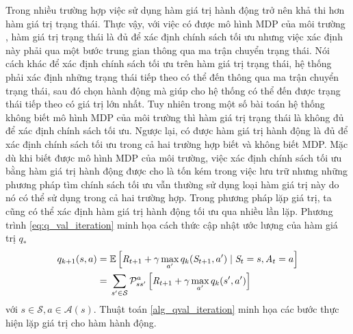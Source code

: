 Trong nhiều trường hợp việc sử dụng hàm giá trị hành động trở nên khả thi hơn hàm giá trị trạng thái. Thực vậy, với việc có được mô hình MDP của môi trường , hàm giá trị trạng thái là đủ để xác định chính sách tối ưu nhưng việc xác định này phải qua một bước trung gian thông qua ma trận chuyển trạng thái. Nói cách khác để xác định chính sách tối ưu trên hàm giá trị trạng thái, hệ thống phải xác định những trạng thái tiếp theo có thể đến thông qua ma trận chuyển trạng thái, sau đó chọn hành động mà giúp cho hệ thống có thể đến được trạng thái tiếp theo có giá trị lớn nhất. Tuy nhiên trong một số bài toán hệ thống không biết mô hình MDP của môi trường thì hàm giá trị trạng thái là không đủ để xác định chính sách tối ưu. Ngược lại, có được hàm giá trị hành động là đủ để xác định chính sách tối ưu trong cả hai trường hợp biết và không biết MDP. Mặc dù khi biết được mô hình MDP của môi trường, việc xác định chính sách tối ưu bằng hàm giá trị hành động được cho là tốn kém trong việc lưu trữ nhưng những phương pháp tìm chính sách tối ưu vẫn thường sử dụng loại hàm giá trị này do nó có thể sử dụng trong cả hai trường hợp. Trong phương pháp lặp giá trị, ta cũng có thể xác định hàm giá trị hành động tối ưu qua nhiều lần lặp. Phương trình \ref{eq:q_val_iteration} minh họa cách thức cập nhật ước lượng của hàm giá trị $q_*$
\begin{align}
q_{k+1}(s,a) = {} & \mathbb{E}\left[\mathit{R}_{t+1} + \gamma \max_{a'}q_{k}(\mathit{S}_{t+1},a') \mid \mathit{S}_{t} = s, \mathit{A}_t = a\right] \notag \\
= {} & \sum_{s' \in \mathcal{S}}\mathcal{P}_{ss'}^{a}\left[\mathit{R}_{t+1} + \gamma \max_{a'}q_{k}(s',a')\right] \label{eq:q_val_iteration}
\end{align}
với $s \in \mathcal{S}, a \in \mathcal{A}(s)$. Thuật toán \ref{alg_qval_iteration} minh họa các bước thực hiện lặp giá trị cho hàm hành động.


